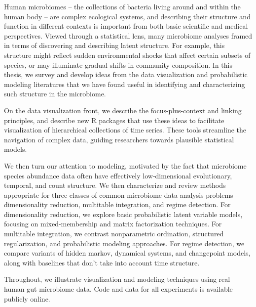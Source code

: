 
Human microbiomes -- the collections of bacteria living around and within the
human body -- are complex ecological systems, and describing their structure and
function in different contexts is important from both basic scientific and
medical perspectives. Viewed through a statistical lens, many microbiome
analyses framed in terms of discovering and describing latent structure. For
example, this structure might reflect sudden environmental shocks that affect
certain subsets of species, or may illuminate gradual shifts in community
composition. In this thesis, we survey and develop ideas from the data
visualization and probabilistic modeling literatures that we have found useful
in identifying and characterizing such structure in the microbiome.

On the data visualization front, we describe the focus-plus-context and linking
principles, and describe new R packages that use these ideas to facilitate
visualization of hierarchical collections of time series. These tools streamline
the navigation of complex data, guiding researchers towards plausible
statistical models.

We then turn our attention to modeling, motivated by the fact that microbiome
species abundance data often have effectively low-dimensional evolutionary,
temporal, and count structure. We then characterize and review methods
appropriate for three classes of common microbiome data analysis problems --
dimensionality reduction, multitable integration, and regime detection. For
dimensionality reduction, we explore basic probabilistic latent variable models,
focusing on mixed-membership and matrix factorization techniques. For multitable
integration, we contrast nonparametric ordination, structured regularization,
and probabilistic modeling approaches. For regime detection, we compare variants
of hidden markov, dynamical systems, and changepoint models, along with
baselines that don't take into account time structure.

Throughout, we illustrate visualization and modeling techniques using real human
gut microbiome data. Code and data for all experiments is available publicly
online.
